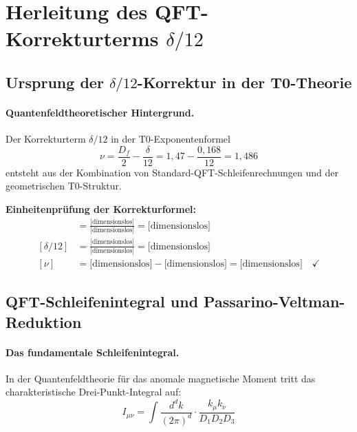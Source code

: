 \documentclass[12pt,a4paper]{article}
\newcommand{\nulep}{\nu}
\theoremstyle{remark}
\begin{document}
\section{Herleitung des QFT-Korrekturterms $\delta/12$}

\subsection{Ursprung der $\delta/12$-Korrektur in der T0-Theorie}

\paragraph{Quantenfeldtheoretischer Hintergrund.}
Der Korrekturterm $\delta/12$ in der T0-Exponentenformel
\begin{equation}
	\nulep = \frac{D_f}{2} - \frac{\delta}{12} = 1{,}47 - \frac{0{,}168}{12} = 1{,}486
\end{equation}
entsteht aus der Kombination von Standard-QFT-Schleifenrechnungen und der geometrischen T0-Struktur.

\begin{units}
	\textbf{Einheitenprüfung der Korrekturformel:}
	\begin{align}
		[D_f/2] &= \frac{\text{[dimensionslos]}}{\text{[dimensionslos]}} = \text{[dimensionslos]} \\
		[\delta/12] &= \frac{\text{[dimensionslos]}}{\text{[dimensionslos]}} = \text{[dimensionslos]} \\
		[\nulep] &= \text{[dimensionslos]} - \text{[dimensionslos]} = \text{[dimensionslos]} \quad \checkmark
	\end{align}
\end{units}

\subsection{QFT-Schleifenintegral und Passarino-Veltman-Reduktion}

\paragraph{Das fundamentale Schleifenintegral.}
In der Quantenfeldtheorie für das anomale magnetische Moment tritt das charakteristische Drei-Punkt-Integral auf:
\begin{equation}
	I_{\mu\nu} = \int \frac{d^d k}{(2\pi)^d} \cdot \frac{k_\mu k_\nu}{D_1 D_2 D_3}
\end{equation}
\end{document}
